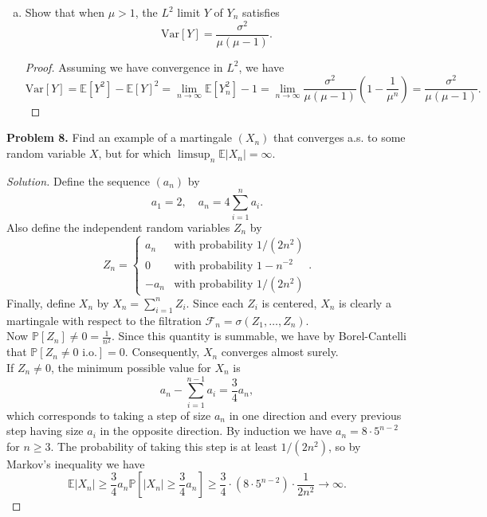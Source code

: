 \documentclass[11pt,letterpaper]{report}
\newcommand{\mcal}[1]{\mathcal{#1}}
\newcommand{\E}{\mathbb{E}}
\newcommand{\Prob}{\mathbb{P}}
\newcommand{\Var}{\text{Var}}
\newenvironment{solution}
{\begin{proof}[Solution]}
{\end{proof}}
\begin{document}
\begin{enumerate}[(a)]
	\item Show that when $\mu>1$, the $L^2$ limit $Y$ of $Y_n$ satisfies
	\[
	\Var[Y] = \frac{\sigma^2}{\mu(\mu-1)}.
	\]
	\begin{proof}
		Assuming we have convergence in $L^2$, we have
		\[
		\Var[Y] = \E[Y^2] - \E[Y]^2 = \lim_{n\to \infty}\E[Y_n^2] - 1 = \lim_{n\to \infty}\frac{\sigma^2}{\mu(\mu-1)}\left(1-\frac{1}{\mu^n}\right) = \frac{\sigma^2}{\mu(\mu-1)}.
		\]
	\end{proof}
\end{enumerate}

\noindent\textbf{Problem 8. }
Find an example of a martingale $(X_n)$ that converges a.s. to some random variable $X$, but for which $\limsup_n \E|X_n| = \infty$.
\begin{solution}
	Define the sequence $(a_n)$ by
	\[
	a_1 = 2,\quad a_n = 4\sum_{i=1}^n a_i.
	\]
	Also define the independent random variables $Z_n$ by
	\[
	Z_n = \begin{cases}
		a_n&\text{with probability }1/(2n^2)\\
		0&\text{with probability }1-n^{-2}\\
		-a_n&\text{with probability }1/(2n^2)
	\end{cases}.
	\]
	Finally, define $X_n$ by $X_n = \sum_{i=1}^n Z_i$. Since each $Z_i$ is centered, $X_n$ is clearly a martingale with respect to the filtration $\mcal{F}_n=\sigma(Z_1, \ldots, Z_n)$.\\

	\noindent Now $\Prob[Z_n]\neq 0 = \frac{1}{n^2}$. Since this quantity is summable, we have by Borel-Cantelli that $\Prob[Z_n \neq 0\text{ i.o.}] = 0$. Consequently, $X_n$ converges almost surely.\\

	\noindent If $Z_n \neq 0$, the minimum possible value for $X_n$ is
	\[
	a_n - \sum_{i=1}^{n-1}a_i = \frac{3}{4}a_n,
	\]
	which corresponds to taking a step of size $a_n$ in one direction and every previous step having size $a_i$ in the opposite direction. By induction we have $a_n = 8\cdot 5^{n-2}$ for $n\geq 3$.  The probability of taking this step is at least $1/(2n^2)$, so by Markov's inequality we have
	\[
	\E|X_n| \geq \frac{3}{4}a_n\Prob\left[|X_n| \geq \frac{3}{4}a_n\right] \geq \frac{3}{4} \cdot (8\cdot 5^{n-2})\cdot \frac{1}{2n^2}\to \infty.
	\]
\end{solution}
\end{document}
